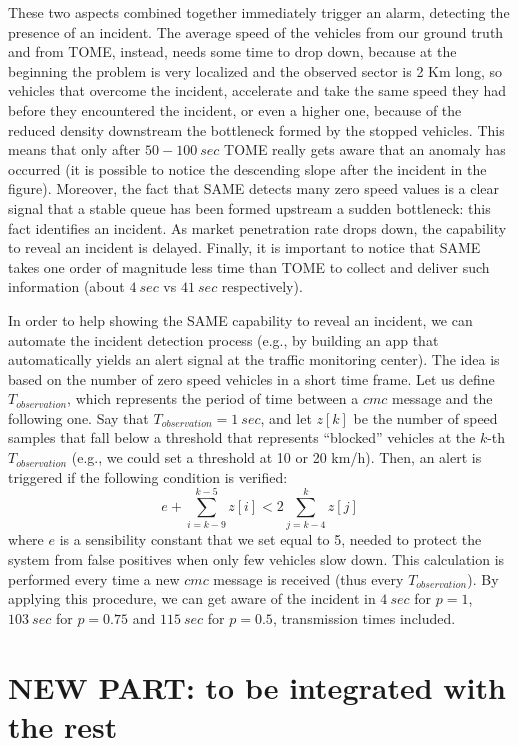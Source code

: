 \documentclass[conference]{IEEEtran}
\begin{document}
These two aspects combined together immediately trigger an alarm, detecting the presence of an incident.
The average speed of the vehicles from our ground truth and from TOME, instead, needs some time to drop down, because at the beginning the problem is very localized and the observed sector is 2 Km long, so vehicles that overcome the incident, accelerate and take the same speed they had before they encountered the incident, or even a higher one, because of the reduced density downstream the bottleneck formed by the stopped vehicles. This means that only after $50-100~sec$ TOME really gets aware that an anomaly has occurred (it is possible to notice the descending slope after the incident in the figure).
Moreover, the fact that SAME detects many zero speed values is a clear signal that a stable queue has been formed upstream a sudden bottleneck: this fact identifies an incident. As market penetration rate drops down, the capability to reveal an incident is delayed.
Finally, it is important to notice that SAME takes one order of magnitude less time than TOME to collect and deliver such information (about $4~sec$ vs $41~sec$ respectively).

In order to help showing the SAME capability to reveal an incident, we can automate the incident detection process (e.g., by building an app that automatically yields an alert signal at the traffic monitoring center). The idea is based on the number of zero speed vehicles in a short time frame. Let us define $T_{observation}$, which represents the period of time between a $cmc$ message and the following one. Say that $T_{observation}=1~sec$, and let $z[k]$ be the number of speed samples that fall below a threshold that represents ``blocked'' vehicles at the $k$-th $T_{observation}$ (e.g., we could set a threshold at 10 or 20 km/h). Then, an alert is triggered if the following condition is verified:
$$
e + \sum_{i=k-9}^{k-5} z[i]  < 2 \sum_{ j=k-4 }^{ k } z[j]
$$
where $e$ is a sensibility constant that we set equal to 5, needed to protect the system from false positives when only few vehicles slow down.
This calculation is performed every time a new $cmc$ message is received (thus every $T_{observation}$). By applying this procedure, we can get aware of the incident in $4~sec$ for $p=1$, $103~sec$ for $p=0.75$ and $115~sec$ for $p=0.5$, transmission times included.



\section{NEW PART: to be integrated with the rest}
\label{sec:Scenario}
\end{document}
